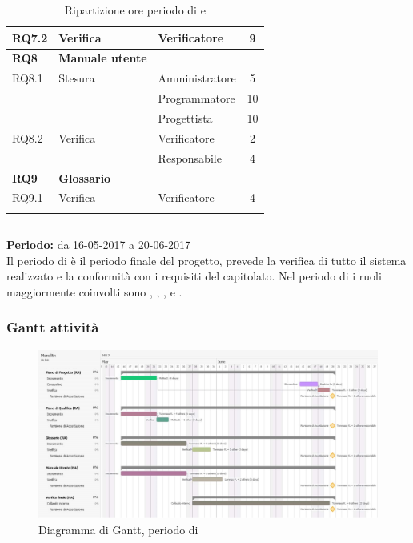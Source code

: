 \begin{longtable}{|l|l|l|c|}
	\hline
	{RQ7.2} & {Verifica} & Verificatore & 9 \\
	\hline
	\textbf{RQ8} & \textbf{Manuale utente} & &  \\
	\hline
	{RQ8.1} & {Stesura} & Amministratore  & 5\\
	& & Programmatore &  10\\
	& & Progettista &  10\\
	\hline
	{RQ8.2} & {Verifica} & Verificatore & 2 \\
	& & Responsabile & 4 \\
	\hline
	\textbf{RQ9} & \textbf{Glossario} & &  \\
	\hline
	{RQ9.1} & {Verifica} & Verificatore &  4 \\
	\hline

	\caption{Ripartizione ore periodo di \PD{} e \Cod{}}
\end{longtable}
\egroup

\subsection{\VV{}}
\textbf{Periodo:} da 16-05-2017 a 20-06-2017 \\
Il periodo di \VV{} è il periodo finale del progetto, prevede la verifica di tutto il sistema realizzato e la conformità con i requisiti del capitolato.
Nel periodo di \VV{} i ruoli maggiormente coinvolti sono \Programmatore{}, \Progettista{}, \Responsabile{}, \Amministratore{} e \Verificatore{}.
\subsubsection{Gantt attività}
\begin{figure}[H]
	\centering
	\includegraphics[width=15cm]{gantt/Gantt_RA3.png}
	\caption{Diagramma di Gantt, periodo di \VV{}}
\end{figure}


